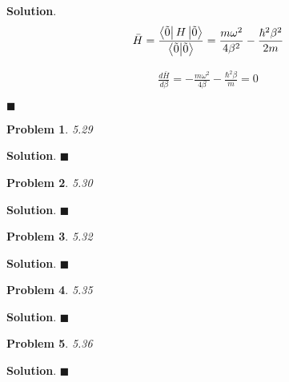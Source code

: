 \documentclass[12pt]{article}
\newtheorem{p}{Problem}
\theoremstyle{definition}
\newenvironment{s}{%
        \begin{trivlist} \item \textbf{Solution}. }{%
            \hspace*{\fill} $\blacksquare$\end{trivlist}}%
\begin{document}
{\begin{s}
\begin{align*}
\bar{H} = \frac{\bra{\tilde{0}}H\ket{\tilde{0}}}{\bra{\tilde{0}}\ket{\tilde{0}}} = \frac{m\omega^{2}}{4\beta^{2}} - \frac{\hbar^{2}\beta^{2}}{2m}
\end{align*}

\begin{align*}
\frac{d\bar{H}}{d\beta} =  -\frac{m\omega^{2}}{4\beta} - \frac{\hbar^{2}\beta}{m} = 0
\end{align*}


\end{s}

\begin{p}
5.29
\end{p}

\begin{s}
\end{s}

\begin{p}
5.30
\end{p}

\begin{s}
\end{s}

\begin{p}
5.32
\end{p}

\begin{s}
\end{s}

\begin{p}
5.35
\end{p}

\begin{s}
\end{s}

\begin{p}
5.36
\end{p}

\begin{s}
\end{s}
\end{document}

